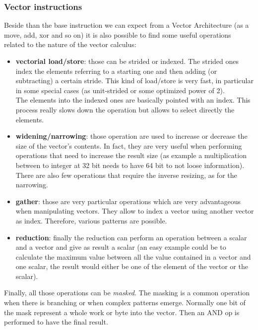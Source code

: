 \subsubsection{Vector instructions}
Beside than the base instruction we can expect from a Vector Architecture (as a move, add, xor and so on) it is also possible to find some useful operations related to the nature of the vector calculus\cite{riscv-v-specs}:
\begin{itemize}
    \item \textbf{vectorial load/store}: those can be strided or indexed. The strided ones index the elements referring to a starting one and then adding (or subtracting) a certain stride. This kind of load/store is very fast, in particular in some special cases (as unit-strided or some optimized power of 2).\\
    The elements into the indexed ones are basically pointed with an index. This process really slows down the operation but allows to select directly the elements.
    
    \item \textbf{widening/narrowing}: those operation are used to increase or decrease the size of the vector's contents. In fact, they are very useful when performing operations that need to increase the result size (as example a multiplication between to integer at 32 bit needs to have 64 bit to not loose information). There are also few operations that require the inverse resizing, as for the narrowing.
    
    \item \textbf{gather}: those are very particular operations which are very advantageous when manipulating vectors. They allow to index a vector using another vector as index. Therefore, various patterns are possible.
    
    \item \textbf{reduction}: finally the reduction can perform an operation between a scalar and a vector and give as result a scalar (an easy example could be to calculate the maximum value between all the value contained in a vector and one scalar, the result would either be one of the element of the vector or the scalar).
    
\end{itemize}


Finally, all those operations can be \textit{masked}. The masking is a common operation when there is branching or when complex patterns emerge.
Normally one bit of the mask represent a whole work or byte into the vector. Then an AND op is performed to have the final result. 


